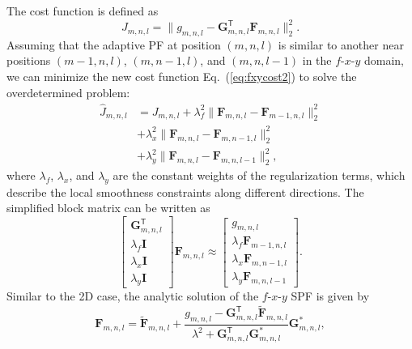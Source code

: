 The cost function is defined as
\begin{equation}
    \label{eq:fxycost1}
    J_{m,n,l} = \| g_{m,n,l} - \mathbf{G}_{m,n,l}^{\mathsf{T}} \mathbf{F}_{m,n,l} \|_{2}^{2}.
\end{equation}
Assuming that the adaptive PF at position $(m,n,l)$ is similar to
another near positions $(m-1,n,l)$, $(m,n-1,l)$, and $(m,n,l-1)$ in
the $f$-$x$-$y$ domain, we can minimize the new cost function
Eq.~(\ref{eq:fxycost2}) to solve the overdetermined problem:
\begin{equation}
    \label{eq:fxycost2}
    \begin{aligned}
        \hat{J}_{m,n,l}
         & = J_{m,n,l} + \lambda_{f}^{2} \| \mathbf{F}_{m,n,l} - \mathbf{F}_{m-1,n,l} \|_{2}^{2} \\
         & + \lambda_{x}^{2} \| \mathbf{F}_{m,n,l} - \mathbf{F}_{m,n-1,l} \|_{2}^{2}             \\
         & + \lambda_{y}^{2} \| \mathbf{F}_{m,n,l} - \mathbf{F}_{m,n,l-1} \|_{2}^{2},
    \end{aligned}
\end{equation}
where $\lambda_{f}$, $\lambda_{x}$, and $\lambda_{y}$ are the constant
weights of the regularization terms, which describe the local
smoothness constraints along different directions. The simplified
block matrix can be written as
\begin{equation}
    \label{eq:fxymatrix}
    \begin{bmatrix}
        \mathbf{G}_{m,n,l}^{\mathsf{T}} \\
        \lambda_{f} \mathbf{I}          \\
        \lambda_{x} \mathbf{I}          \\
        \lambda_{y} \mathbf{I}
    \end{bmatrix}
    \mathbf{F}_{m,n,l}
    \approx
    \begin{bmatrix}
        g_{m,n,l}                        \\
        \lambda_{f} \mathbf{F}_{m-1,n,l} \\
        \lambda_{x} \mathbf{F}_{m,n-1,l} \\
        \lambda_{y} \mathbf{F}_{m,n,l-1}
    \end{bmatrix}.
\end{equation}
Similar to the 2D case, the analytic solution of the $f$-$x$-$y$ SPF
is given by
\begin{equation}
    \label{eq:fxysolution}
    \mathbf{F}_{m,n,l} = \mathbf{\tilde{F}}_{m,n,l} +
    \frac{ g_{m,n,l} - \mathbf{G}_{m,n,l}^{\mathsf{T}} \mathbf{\tilde{F}}_{m,n,l} }
    { \lambda^{2} + \mathbf{G}_{m,n,l}^{\mathsf{T}} \mathbf{G}_{m,n,l}^{*} }
    \mathbf{G}_{m,n,l}^{*},
\end{equation}
